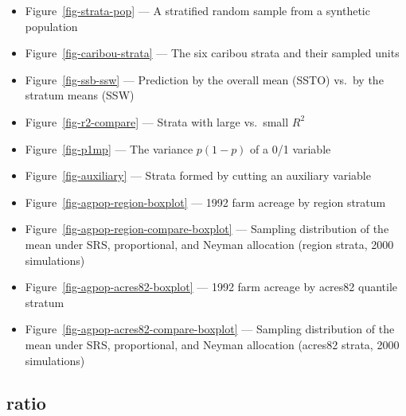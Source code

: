 \documentclass[
  letterpaper,
  DIV=11,
  numbers=noendperiod]{scrreprt}
\providecommand{\tightlist}{%
  \setlength{\itemsep}{0pt}\setlength{\parskip}{0pt}}
\renewcommand{\[}{\begin{equation}}
\renewcommand{\]}{\end{equation}}
\begin{document}
\begin{itemize}
\tightlist
\item
  Figure~\ref{fig-strata-pop} --- A stratified random sample from a
  synthetic population
\item
  Figure~\ref{fig-caribou-strata} --- The six caribou strata and their
  sampled units
\item
  Figure~\ref{fig-ssb-ssw} --- Prediction by the overall mean (SSTO)
  vs.~by the stratum means (SSW)
\item
  Figure~\ref{fig-r2-compare} --- Strata with large vs.~small \(R^2\)
\item
  Figure~\ref{fig-p1mp} --- The variance \(p(1-p)\) of a 0/1 variable
\item
  Figure~\ref{fig-auxiliary} --- Strata formed by cutting an auxiliary
  variable
\item
  Figure~\ref{fig-agpop-region-boxplot} --- 1992 farm acreage by region
  stratum
\item
  Figure~\ref{fig-agpop-region-compare-boxplot} --- Sampling
  distribution of the mean under SRS, proportional, and Neyman
  allocation (region strata, 2000 simulations)
\item
  Figure~\ref{fig-agpop-acres82-boxplot} --- 1992 farm acreage by
  acres82 quantile stratum
\item
  Figure~\ref{fig-agpop-acres82-compare-boxplot} --- Sampling
  distribution of the mean under SRS, proportional, and Neyman
  allocation (acres82 strata, 2000 simulations)
\end{itemize}

\subsection{ratio}\label{ratio}
\end{document}

